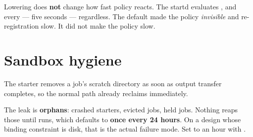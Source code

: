\begin{keypoint}
Lowering  does \textbf{not} change how fast policy reacts.
The startd evaluates ,  and  every
 --- five seconds --- regardless. The default made the
policy \emph{invisible} and re-registration slow. It did not make the policy slow.
\end{keypoint}

\section{Sandbox hygiene}

The starter removes a job's scratch directory as soon as output transfer
completes, so the normal path already reclaims immediately.

The leak is \textbf{orphans}: crashed starters, evicted jobs, held jobs. Nothing
reaps those until  runs, which defaults to \textbf{once every
24 hours}. On a design whose binding constraint is disk, that is the actual
failure mode. Set  to an hour with .
